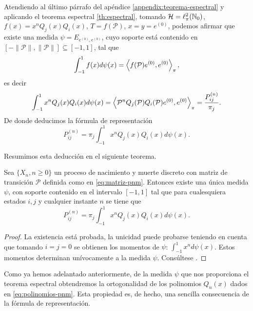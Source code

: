     Atendiendo al último párrafo del apéndice \ref{appendix:teorema-espectral} y aplicando el teorema espectral \ref{th:espectral}, tomando $\mathcal{H}=\ell_\pi^2(\mathbb{N}_0)$, $f(x)=x^n Q_j(x)Q_i(x)$, $T=f(\mathcal{P})$, $x=y=e^{(0)}$, podemos afirmar que existe una medida $\psi=E_{e^{(0)},e^{(0)}}$, cuyo soporte está contenido en $[-\|\mathcal{P}\|,\|\mathcal{P}\|]\subseteq[-1,1]$, tal que 
    \begin{equation*}
        \int_{-1}^1 f(x)d\psi(x) = \left\langle f(\mathcal{P})e^{(0)} , e^{(0)} \right\rangle_\pi,
    \end{equation*}
    es decir
    \begin{equation*}
        \int_{-1}^1 x^n Q_j(x)Q_i(x)d\psi(x) = \left\langle \mathcal{P}^n Q_j(\mathcal{P})Q_i(\mathcal{P})e^{(0)} , e^{(0)} \right\rangle_\pi = \dfrac{P_{ij}^{(n)}}{\pi_j}.
    \end{equation*}
    De donde deducimos la fórmula de representación
    \begin{equation*}
        P_{ij}^{(n)}=\pi_j \int_{-1}^1 x^n Q_j(x)Q_i(x)d\psi(x).
    \end{equation*}

    Resumimos esta deducción en el siguiente teorema.

    \begin{teorema}
        Sea $\{X_n, n\geq 0\}$ un proceso de nacimiento y muerte discreto con matriz de transición $\mathcal{P}$ definida como en \eqref{eq:matriz-pnm}. Entonces existe una única medida $\psi$, con soporte contenido en el intervalo $[-1,1]$ tal que para cualesquiera estados $i,j$ y cualquier instante $n$ se tiene que
        \begin{equation}
            \label{eq:formula-representacion}
            P_{ij}^{(n)}=\pi_j \int_{-1}^1 x^n Q_j(x)Q_i(x)d\psi(x).
        \end{equation}
    \end{teorema}
    \begin{proof}
        La existencia está probada, la unicidad puede probarse teniendo en cuenta que tomando $i=j=0$ se obtienen los momentos de $\psi$: $\int_{-1}^1 x^n d\psi(x)$. Estos momentos determinan unívocamente a la medida $\psi$. Consúltese \cite[Theorem 1]{random-walks}.
    \end{proof}

    Como ya hemos adelantado anteriormente, de la medida $\psi$ que nos proporciona el teorema espectral obtendremos la ortogonalidad de los polinomios $Q_n(x)$ dados en \eqref{eq:polinomios-pnm}. Esta propiedad es, de hecho, una sencilla consecuencia de la fórmula de representación.

